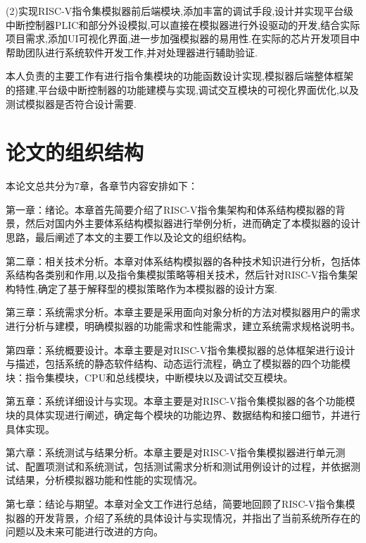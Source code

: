 (2)实现RISC-V指令集模拟器前后端模块,添加丰富的调试手段,设计并实现平台级中断控制器PLIC和部分外设模拟,可以直接在模拟器进行外设驱动的开发,结合实际项目需求,添加UI可视化界面,进一步加强模拟器的易用性.在实际的芯片开发项目中帮助团队进行系统软件开发工作,并对处理器进行辅助验证.


本人负责的主要工作有进行指令集模块的功能函数设计实现,模拟器后端整体框架的搭建,平台级中断控制器的功能建模与实现,调试交互模块的可视化界面优化,以及测试模拟器是否符合设计需要.


\section{论文的组织结构}
本论文总共分为7章，各章节内容安排如下：


第一章：绪论。本章首先简要介绍了RISC-V指令集架构和体系结构模拟器的背景，然后对国内外主要体系结构模拟器进行举例分析，进而确定了本模拟器的设计思路，最后阐述了本文的主要工作以及论文的组织结构。


第二章：相关技术分析。本章对体系结构模拟器的各种技术知识进行分析，包括体系结构各类别和作用,以及指令集模拟策略等相关技术，然后针对RISC-V指令集架构特性,确定了基于解释型的模拟策略作为本模拟器的设计方案.


第三章：系统需求分析。本章主要是采用面向对象分析的方法对模拟器用户的需求进行分析与建模，明确模拟器的功能需求和性能需求，建立系统需求规格说明书。


第四章：系统概要设计。本章主要是对RISC-V指令集模拟器的总体框架进行设计与描述，包括系统的静态软件结构、动态运行流程，确立了模拟器的四个功能模块：指令集模块，CPU和总线模块，中断模块以及调试交互模块。


第五章：系统详细设计与实现。本章主要是对RISC-V指令集模拟器的各个功能模块的具体实现进行阐述，确定每个模块的功能边界、数据结构和接口细节，并进行具体实现。


第六章：系统测试与结果分析。本章主要是对RISC-V指令集模拟器进行单元测试、配置项测试和系统测试，包括测试需求分析和测试用例设计的过程，并依据测试结果，分析模拟器功能和性能的实现情况。


第七章：结论与期望。本章对全文工作进行总结，简要地回顾了RISC-V指令集模拟器的开发背景，介绍了系统的具体设计与实现情况，并指出了当前系统所存在的问题以及未来可能进行改进的方向。


